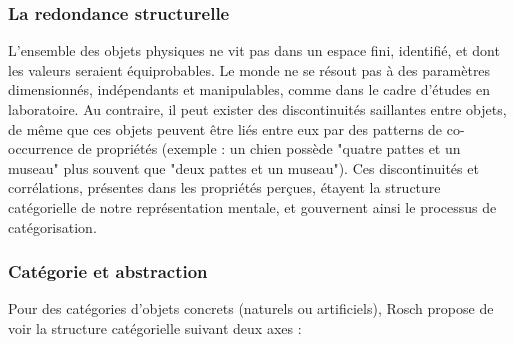 \subsubsection{La redondance structurelle}

L'ensemble des objets physiques ne vit pas dans un espace fini, identifié, et dont les valeurs seraient équiprobables. Le monde ne se résout pas à des paramètres dimensionnés, indépendants et manipulables, comme dans le cadre d'études en laboratoire. Au contraire, il peut exister des discontinuités saillantes entre objets, de même que ces objets peuvent être liés entre eux par des patterns de co-occurrence de propriétés (exemple : un chien possède "quatre pattes et un museau" plus souvent que "deux pattes et un museau"). Ces discontinuités et corrélations, présentes dans les propriétés perçues, étayent la structure catégorielle de notre représentation mentale, et gouvernent ainsi le processus de catégorisation.
 
\subsubsection{Catégorie et abstraction}
 \label{sec:ch3_categoEtAbstract}
 
Pour des catégories d'objets concrets (naturels ou artificiels), Rosch propose de voir la structure catégorielle suivant deux axes \citep[p. 30-41]{rosch1978cognition}:

